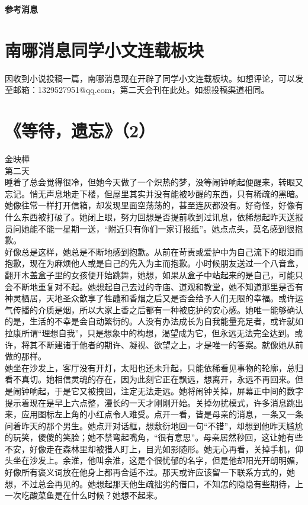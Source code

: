 \documentclass[letterpaper, 12pt]{article}
\begin{document}
\vspace{4mm}
\centerline{\huge\textbf{参考消息}}
\begin{multicols}{2}
\section{南哪消息同学小文连载板块}
因收到小说投稿一篇，南哪消息现在开辟了同学小文连载板块。如想评论，可以发至邮箱：1329527951@qq.com，第二天会刊在此处。如想投稿渠道相同。
\section{《等待，遗忘》（2）}
金映樺\\

第二天\\
\newCJKfontfamily{}\fan
睡着了总会觉得很冷，但她今天做了一个炽热的梦，没等闹钟响起便醒来，转眼又忘记。悄无声息地走下楼，但屋里其实并没有能被吵醒的东西，只有稀疏的黑暗。她像往常一样打开信箱，却发现里面空荡荡的，甚至连灰都没有。好奇怪，好像有什么东西被打破了。她闭上眼，努力回想是否提前收到过讯息，依稀想起昨天送报员问她能不能一星期一送，“附近只有你们一家订报纸”。她点点头，莫名感到很抱歉。\\

好像总是这样，她总是不断地感到抱歉。从前在苛责或爱护中为自己流下的眼泪而抱歉，现在为麻烦他人或是自己的先入为主而抱歉。小时候朋友送过一个八音盒，翻开木盖盒子里的女孩便开始跳舞，她想，如果从盒子中站起来的是自己，可能只会不断地重复对不起。她想起自己去过的寺庙、道观和教堂，她不知道那里是否有神灵栖居，天地圣众歆享了牲醴和香烟之后又是否会给予人们无限的幸福。或许运气传播的介质是烟，所以大家上香之后都有一种被庇护的安心感。她唯一能够确认的是，生活的不幸是会自动繁衍的。人没有办法成长为自我能量充足者，或许就如拉康所谓“理想自我”，只是想象中的构想，渴望成为它，但永远无法完全达到。或许，将其不断建诸于他者的期许、凝视、欲望之上，才是唯一的答案。就像她从前做的那样。\\

她坐在沙发上，客厅没有开灯，太阳也还未升起，只能依稀看见事物的轮廓，总归看不真切。她相信灵魂的存在，因为此刻它正在飘远，想离开，永远不再回来。但是闹钟响起，于是它又被拽回，注定无法走远。她将闹钟关掉，屏幕正中间的数字提示着现在是早上六点整，漫长的一天才刚刚开始。关掉勿扰模式，许多消息跳出来，应用图标左上角的小红点令人难受。点开一看，皆是母亲的消息，一条又一条问着昨天的那个男生。她点开对话框，想敷衍地回一句“不错”，却想到他昨天尴尬的玩笑，傻傻的笑脸；她不禁弯起嘴角，“很有意思”。母亲居然秒回，这让她有些不安，好像走在森林里却被猎人盯上，目光如影随形。她无心再看，关掉手机，仰头坐在沙发上。余淮，他叫余淮，这是个很忧郁的名字，但是他却阳光开朗明媚，好像所有褒义词放在他身上都再合适不过。那天或许应该留一下联系方式的，她想，不过总会再见的。她想起那天他生疏拙劣的借口，不知怎的隐隐有些期待，上一次吃酸菜鱼是在什么时候？她想不起来。\\


\end{multicols}
\end{document}
